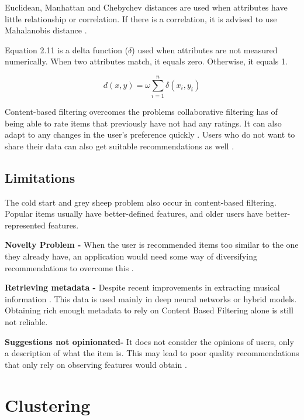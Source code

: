 Euclidean, Manhattan and Chebychev distances are used when attributes have little relationship or correlation. If there is a correlation, it is advised to use Mahalanobis distance \citep{celma_recommendation_2010}.

Equation 2.11 is a delta function ($\delta $) used when attributes are not measured numerically. When two attributes match, it equals zero. Otherwise, it equals 1.

\begin{equation}
	d(x,y) = \omega \sum _{ i = 1 } ^{ n } \delta (x _{i}, y _{i})
\end{equation}

Content-based filtering overcomes the problems collaborative filtering has of being able to rate items that previously have not had any ratings. It can also adapt to any changes in the user's preference quickly \citep{isinkaye_recommendation_2015}. Users who do not want to share their data can also get suitable recommendations as well \citep{k_you_2006}.

\subsection{Limitations}
The cold start and grey sheep problem also occur in content-based filtering. Popular items usually have better-defined features, and older users have better-represented features.

\textbf{Novelty Problem - } When the user is recommended items too similar to the one they already have, an application would need some way of diversifying recommendations to overcome this \citep{celma_recommendation_2010}.

\textbf{Retrieving metadata - } Despite recent improvements in extracting musical information \citep{vall_feature-combination_2019, singh_novel_2022}. This data is used mainly in deep neural networks or hybrid models. Obtaining rich enough metadata to rely on Content Based Filtering alone is still not reliable.

\textbf{Suggestions not opinionated- } It does not consider the opinions of users, only a description of what the item is. This may lead to poor quality recommendations that only rely on observing features would obtain \citep{celma_recommendation_2010}.  

\section{Clustering}


